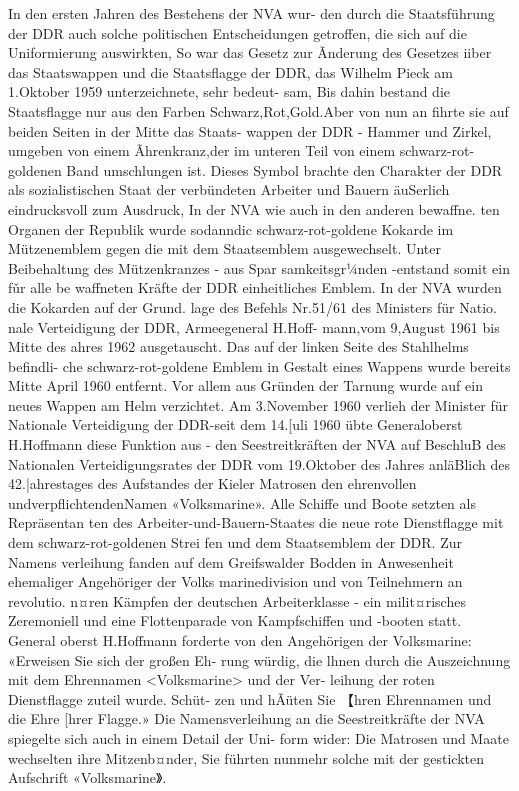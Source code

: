 

In den ersten Jahren des Bestehens der NVA wur-
den durch die Staatsführung der DDR auch solche
politischen Entscheidungen getroffen, die sich auf
die Uniformierung auswirkten, So war das Gesetz
zur Ãnderung des Gesetzes iiber das Staatswappen
und die Staatsflagge der DDR, das Wilhelm Pieck
am 1.Oktober 1959 unterzeichnete, sehr bedeut-
sam, Bis dahin bestand die Staatsflagge nur aus den
Farben Schwarz,Rot,Gold.Aber von nun an
fihrte sie auf beiden Seiten in der Mitte das Staats-
wappen der DDR - Hammer und Zirkel, umgeben
von einem Ãhrenkranz,der im unteren Teil von
einem schwarz-rot-goldenen Band umschlungen ist.
Dieses Symbol brachte den Charakter der DDR
als sozialistischen Staat der verbündeten Arbeiter und Bauern äuSerlich eindrucksvoll zum Ausdruck,
In der NVA wie auch in den anderen bewaffne.
ten Organen der Republik wurde sodanndic
schwarz-rot-goldene Kokarde im Mützenemblem
gegen die mit dem Staatsemblem ausgewechselt.
Unter Beibehaltung des Mützenkranzes - aus Spar
samkeitsgr¼nden -entstand somit ein fǔr alle be
waffneten Kräfte der DDR einheitliches Emblem.
In der NVA wurden die Kokarden auf der Grund.
lage des Befehls Nr.51/61 des Ministers für Natio.
nale Verteidigung der DDR, Armeegeneral H.Hoff-
mann,vom 9,August 1961 bis Mitte des ahres
1962 ausgetauscht.
Das auf der linken Seite des Stahlhelms befindli-
che schwarz-rot-goldene Emblem in Gestalt eines
Wappens wurde bereits Mitte April 1960 entfernt.
Vor allem aus Gründen der Tarnung wurde auf ein
neues Wappen am Helm verzichtet.
Am 3.November 1960 verlieh der Minister für
Nationale Verteidigung der DDR-seit dem
14.[uli 1960 übte Generaloberst H.Hoffmann diese
Funktion aus - den Seestreitkräften der NVA auf
BeschluB des Nationalen Verteidigungsrates der
DDR vom 19.Oktober des Jahres anläBlich des
42.|ahrestages des Aufstandes der Kieler Matrosen
den ehrenvollen undverpflichtendenNamen
«Volksmarine».
Alle Schiffe und Boote setzten als Repräsentan
ten des Arbeiter-und-Bauern-Staates die neue rote
Dienstflagge mit dem schwarz-rot-goldenen Strei
fen und dem Staatsemblem der DDR. Zur Namens
verleihung fanden auf dem Greifswalder Bodden
in Anwesenheit ehemaliger Angehöriger der Volks
marinedivision und von Teilnehmern an revolutio.
n¤ren Kämpfen der deutschen Arbeiterklasse - ein
milit¤risches Zeremoniell und eine Flottenparade
von Kampfschiffen und -booten statt. General
oberst H.Hoffmann forderte von den Angehörigen der Volksmarine: «Erweisen Sie sich der großen Eh-
rung würdig, die lhnen durch die Auszeichnung
mit dem Ehrennamen <Volksmarine> und der Ver-
leihung der roten Dienstflagge zuteil wurde. Schüt-
zen und hÃüten Sie 【hren Ehrennamen und die Ehre
[hrer Flagge.»
Die Namensverleihung an die Seestreitkräfte der
NVA spiegelte sich auch in einem Detail der Uni-
form wider: Die Matrosen und Maate wechselten
ihre Mitzenb¤nder, Sie führten nunmehr solche
mit der gestickten Aufschrift «Volksmarine》.

